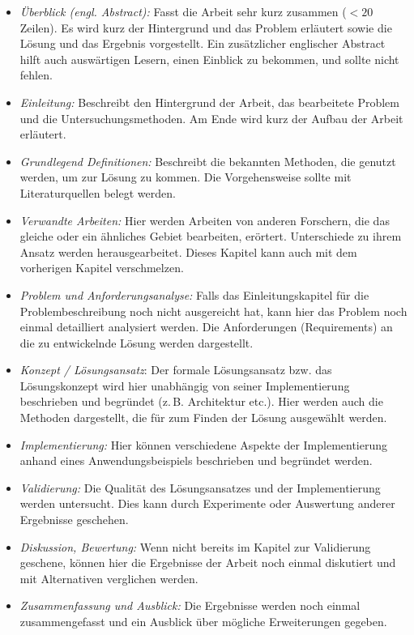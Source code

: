 \documentclass[conference,final,a4paper]{IEEEtran}
\begin{document}
\begin{itemize}
\item \emph{Überblick (engl. Abstract):} Fasst die Arbeit sehr kurz zusammen ($<20$ Zeilen). Es wird kurz der Hintergrund und das Problem erläutert sowie die Lösung und das Ergebnis vorgestellt. Ein zusätzlicher englischer Abstract hilft auch auswärtigen Lesern, einen Einblick zu bekommen, und sollte nicht fehlen.
\item \emph{Einleitung:} Beschreibt den Hintergrund der Arbeit, das bearbeitete Problem und die Untersuchungsmethoden. Am Ende wird kurz der Aufbau der Arbeit erläutert.
\item \emph{Grundlegend Definitionen:} Beschreibt die bekannten Methoden, die genutzt werden, um zur Lösung zu kommen. Die Vorgehensweise sollte mit Literaturquellen belegt werden.
\item \emph{Verwandte Arbeiten:} Hier werden Arbeiten von anderen Forschern, die das gleiche oder ein ähnliches Gebiet bearbeiten, erörtert. Unterschiede zu ihrem Ansatz werden herausgearbeitet. Dieses Kapitel kann auch mit dem vorherigen Kapitel verschmelzen.
\item \emph{Problem und Anforderungsanalyse:} Falls das Einleitungskapitel für die Problembeschreibung noch nicht ausgereicht hat, kann hier das Problem noch einmal detailliert analysiert werden. Die Anforderungen (Requirements) an die zu entwickelnde Lösung werden dargestellt.
\item \emph{Konzept / Lösungsansatz}: Der formale Lösungsansatz bzw. das Lösungskonzept wird hier unabhängig von seiner Implementierung beschrieben und begründet (z.\,B. Architektur etc.). Hier werden auch die Methoden dargestellt, die für zum Finden der Lösung ausgewählt werden.
\item \emph{Implementierung:} Hier können verschiedene Aspekte der Implementierung anhand eines Anwendungsbeispiels beschrieben und begründet werden.
\item \emph{Validierung:} Die Qualität des Lösungsansatzes und der Implementierung werden untersucht. Dies kann durch Experimente oder Auswertung anderer Ergebnisse geschehen.
\item \emph{Diskussion, Bewertung:} Wenn nicht bereits im Kapitel zur Validierung geschene, können hier die Ergebnisse der Arbeit noch einmal diskutiert und mit Alternativen verglichen werden.
\item \emph{Zusammenfassung und Ausblick:} Die Ergebnisse werden noch einmal zusammengefasst und ein Ausblick über mögliche Erweiterungen gegeben.
\end{itemize}
\end{document}
